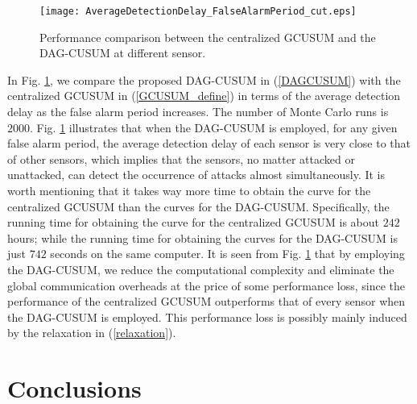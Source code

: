 \documentclass[11pt, draftclsnofoot, onecolumn]{IEEEtran}
\begin{document}
\vspace{3mm}

\begin{figure}[htb]
	\centerline{
		\texttt{[image: AverageDetectionDelay\_FalseAlarmPeriod\_cut.eps]}
	}
	\caption{Performance comparison between the centralized GCUSUM and the DAG-CUSUM at different sensor.}			
	\label{Fig_Performance_Comparison}	
\end{figure}

In Fig. \ref{Fig_Performance_Comparison}, we compare the proposed DAG-CUSUM in (\ref{DAGCUSUM}) with the centralized GCUSUM in (\ref{GCUSUM_define}) in terms of the average detection delay as the false alarm period increases. The number of Monte Carlo runs is $2000$. Fig. \ref{Fig_Performance_Comparison} illustrates that when the DAG-CUSUM is employed, for any given false alarm period, the average detection delay of each sensor is very close to that of other sensors, which implies that the sensors, no matter attacked or unattacked, can detect the occurrence of attacks almost simultaneously. It is worth mentioning that it takes way more time to obtain the curve for the centralized GCUSUM than the curves for the DAG-CUSUM.   Specifically, the running time for obtaining the curve for the centralized GCUSUM is about $242$ hours; while the running time for obtaining the curves for the DAG-CUSUM is just $742$ seconds on the same computer.   
It is seen from Fig. \ref{Fig_Performance_Comparison} that by employing the DAG-CUSUM, we reduce the computational complexity and eliminate the global communication overheads  at the price of some performance loss, since the performance of the centralized GCUSUM outperforms that of every sensor when the DAG-CUSUM is employed. This performance loss is possibly mainly induced by the relaxation in (\ref{relaxation}). 


\section{Conclusions}
\label{Section_Conclusions}
\end{document}
